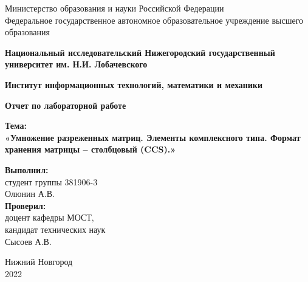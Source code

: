 \documentclass{report}
\begin{document}
\begin{titlepage}
\begin{center}
    Министерство образования и науки Российской Федерации \\
    Федеральное государственное автономное образовательное учреждение высшего образования
\end{center}
\begin{center}
    \textbf{Национальный исследовательский Нижегородский государственный университет им. Н.И. Лобачевского} \\
\end{center}
\begin{center}
    \textbf{Институт информационных технологий, математики и механики}\\
\end{center}

\vspace{4em}

\begin{center}
    \textbf{\Large Отчет по лабораторной работе} \\
\end{center}

\begin{center}
    \textbf{\Large Тема:} \\
    \textbf{\Large «Умножение разреженных матриц. Элементы комплексного типа. Формат хранения матрицы – столбцовый (CCS).»}
\end{center}

\vspace{4em}

\begin{flushright}
\begin{minipage}{0.55\textwidth}
\begin{flushleft}

\textbf{Выполнил:} \\
студент группы 381906-3 \\
Олюнин А.В. \\

\textbf{Проверил:} \\
доцент кафедры МОСТ, \\
кандидат технических наук \\
Сысоев А.В. \\
\end{flushleft}
\end{minipage}
\end{flushright}


\vspace{\fill}

\begin{center}
Нижний Новгород \\
2022
\end{center}

\end{titlepage}
\end{document}
